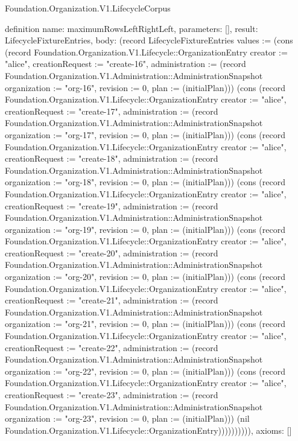 \begin{lexlean}{Foundation.Organization.V1.LifecycleCorpus}
\begin{semanticmodule}
definition{
  name: maximumRowsLeftRightLeft,
  parameters: [],
  result: LifecycleFixtureEntries,
  body: (record LifecycleFixtureEntries {values := (cons (record Foundation.Organization.V1.Lifecycle::OrganizationEntry {creator := "alice", creationRequest := "create-16", administration := (record Foundation.Organization.V1.Administration::AdministrationSnapshot {organization := "org-16", revision := 0, plan := (initialPlan)})}) (cons (record Foundation.Organization.V1.Lifecycle::OrganizationEntry {creator := "alice", creationRequest := "create-17", administration := (record Foundation.Organization.V1.Administration::AdministrationSnapshot {organization := "org-17", revision := 0, plan := (initialPlan)})}) (cons (record Foundation.Organization.V1.Lifecycle::OrganizationEntry {creator := "alice", creationRequest := "create-18", administration := (record Foundation.Organization.V1.Administration::AdministrationSnapshot {organization := "org-18", revision := 0, plan := (initialPlan)})}) (cons (record Foundation.Organization.V1.Lifecycle::OrganizationEntry {creator := "alice", creationRequest := "create-19", administration := (record Foundation.Organization.V1.Administration::AdministrationSnapshot {organization := "org-19", revision := 0, plan := (initialPlan)})}) (cons (record Foundation.Organization.V1.Lifecycle::OrganizationEntry {creator := "alice", creationRequest := "create-20", administration := (record Foundation.Organization.V1.Administration::AdministrationSnapshot {organization := "org-20", revision := 0, plan := (initialPlan)})}) (cons (record Foundation.Organization.V1.Lifecycle::OrganizationEntry {creator := "alice", creationRequest := "create-21", administration := (record Foundation.Organization.V1.Administration::AdministrationSnapshot {organization := "org-21", revision := 0, plan := (initialPlan)})}) (cons (record Foundation.Organization.V1.Lifecycle::OrganizationEntry {creator := "alice", creationRequest := "create-22", administration := (record Foundation.Organization.V1.Administration::AdministrationSnapshot {organization := "org-22", revision := 0, plan := (initialPlan)})}) (cons (record Foundation.Organization.V1.Lifecycle::OrganizationEntry {creator := "alice", creationRequest := "create-23", administration := (record Foundation.Organization.V1.Administration::AdministrationSnapshot {organization := "org-23", revision := 0, plan := (initialPlan)})}) (nil Foundation.Organization.V1.Lifecycle::OrganizationEntry)))))))))}),
  axioms: []
}


\end{semanticmodule}
\end{lexlean}
